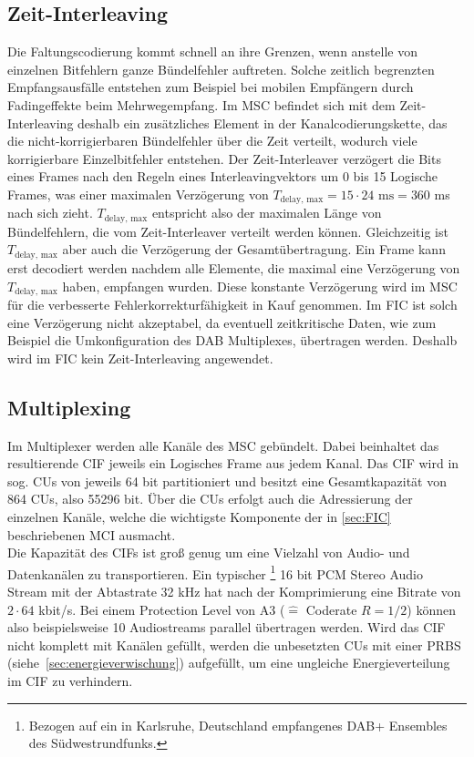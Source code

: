 \subsection{Zeit-Interleaving}
\label{sec:time_interleaving_std}
Die Faltungscodierung kommt schnell an ihre Grenzen, wenn anstelle von einzelnen Bitfehlern ganze Bündelfehler auftreten. Solche zeitlich begrenzten Empfangsausfälle entstehen zum Beispiel bei mobilen Empfängern durch Fadingeffekte beim Mehrwegempfang. Im \ac{MSC} befindet sich mit dem Zeit-Interleaving deshalb ein zusätzliches Element in der Kanalcodierungskette, das die nicht-korrigierbaren Bündelfehler über die Zeit verteilt, wodurch viele korrigierbare Einzelbitfehler entstehen. Der Zeit-Interleaver verzögert die Bits eines Frames nach den Regeln eines Interleavingvektors um 0 bis 15 Logische Frames, was einer maximalen Verzögerung von $T_{\text{delay, max}} = 15 \cdot 24 \text{ ms} = 360$ ms nach sich zieht. $T_{\text{delay, max}}$ entspricht also der maximalen Länge von Bündelfehlern, die vom Zeit-Interleaver verteilt werden können. Gleichzeitig ist $T_{\text{delay, max}}$ aber auch die Verzögerung der Gesamtübertragung. Ein Frame kann erst decodiert werden nachdem alle Elemente, die maximal eine Verzögerung von $T_{\text{delay, max}}$ haben, empfangen wurden. Diese konstante Verzögerung wird im MSC für die verbesserte Fehlerkorrekturfähigkeit in Kauf genommen. Im FIC ist solch eine Verzögerung nicht akzeptabel, da eventuell zeitkritische Daten, wie zum Beispiel die Umkonfiguration des DAB Multiplexes, übertragen werden. Deshalb wird im FIC kein Zeit-Interleaving angewendet.

\subsection{Multiplexing}
\label{sec:MUX}
Im Multiplexer werden alle Kanäle des MSC gebündelt. Dabei beinhaltet das resultierende \ac{CIF} jeweils ein Logisches Frame aus jedem Kanal. Das CIF wird in sog. \acp{CU} von jeweils 64 bit partitioniert und besitzt eine Gesamtkapazität von 864 \acp{CU}, also 55296 bit. Über die \acp{CU} erfolgt auch die Adressierung der einzelnen Kanäle, welche die wichtigste Komponente der in \ref{sec:FIC} beschriebenen \ac{MCI} ausmacht.\\
Die Kapazität des CIFs ist groß genug um eine Vielzahl von Audio- und Datenkanälen zu transportieren. Ein typischer \footnote{Bezogen auf ein in Karlsruhe, Deutschland empfangenes DAB+ Ensembles des Südwestrundfunks.} 16 bit PCM Stereo Audio Stream mit der Abtastrate 32 kHz hat nach der Komprimierung eine Bitrate von $2\cdot64$ kbit/s. Bei einem Protection Level von A3 ($\hat{=}$ Coderate $R=1/2$) können also beispielsweise 10 Audiostreams parallel übertragen werden.
Wird das CIF nicht komplett mit Kanälen gefüllt, werden die unbesetzten CUs mit einer \ac{PRBS} (siehe~\ref{sec:energieverwischung}) aufgefüllt, um eine ungleiche Energieverteilung im CIF zu verhindern.

